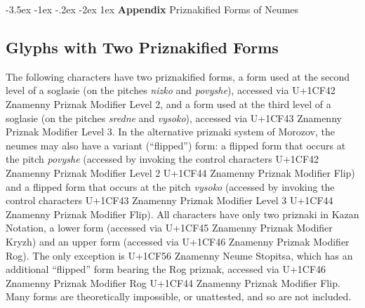 \documentclass[12pt]{article}
\makeatletter
\renewcommand\section{\@startsection {section}{1}{\z@}%
                                   {-3.5ex \@plus -1ex \@minus -.2ex}%
                                   {-2ex \@plus1ex}%
                                   {\normalfont\Large\bfseries Appendix } }%
\makeatother
\begin{document}
\pagestyle{empty}
\addtocounter{section}{2}
\section{Priznakified Forms of Neumes}

\subsection{Glyphs with Two Priznakified Forms}

\noindent The following characters have two priznakified forms, a form used at the second level of a soglasie (on the pitches \emph{nizko} and \emph{povyshe}), accessed via U+1CF42 Znamenny Priznak Modifier Level 2, and a form used at the third level of a soglasie (on the pitches \emph{sredne} and \emph{vysoko}), accessed via U+1CF43 Znamenny Priznak Modifier Level 3. In the alternative priznaki system of Morozov, the neumes may also have a variant (``flipped'') form: a flipped form that occurs at the pitch \emph{povyshe} (accessed by invoking the control characters U+1CF42 Znamenny Priznak Modifier Level 2 U+1CF44 Znamenny Priznak Modifier Flip) and a flipped form that occurs at the pitch \emph{vysoko} (accessed by invoking the control characters U+1CF43 Znamenny Priznak Modifier Level 3 U+1CF44 Znamenny Priznak Modifier Flip). All characters have only two priznaki in Kazan Notation, a lower form (accessed via U+1CF45 Znamenny Priznak Modifier Kryzh) and an upper form (accessed via U+1CF46 Znamenny Priznak Modifier Rog). The only exception is U+1CF56 Znamenny Neume Stopitsa, which has an additional ``flipped'' form bearing the Rog priznak, accessed via U+1CF46 Znamenny Priznak Modifier Rog U+1CF44 Znamenny Priznak Modifier Flip. Many forms are theoretically impossible, or unattested, and so are not included.
\end{document}

